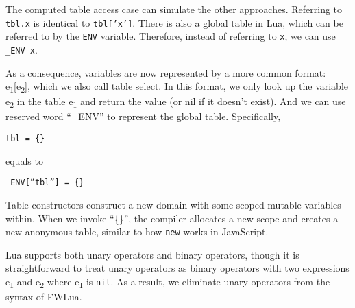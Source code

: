 The computed table access case can simulate the other approaches.
Referring to {\tt tbl.x} is identical to {\tt tbl['x']}.
There is also a global table in Lua, which can be referred to by the {\tt ENV} variable.
Therefore, instead of referring to {\tt x}, we can use {\tt \_ENV x}.

As a consequence, variables are now represented by a more common format: e\textsubscript{1}[e\textsubscript{2}], which we also call table select. In this format, we only look up the variable e\textsubscript{2} in the table e\textsubscript{1} and return the value (or nil if it doesn't exist). And we can use reserved word ``\_ENV'' to represent the global table. Specifically,
\begin{flushleft}
\tt tbl = \{\}\\
\end{flushleft}
equals to
\begin{flushleft}
\tt \_ENV[``tbl''] = \{\}\\
\end{flushleft}

Table constructors
construct a new domain with some scoped mutable variables within.
When we invoke ``\{\}'', the compiler allocates a new scope
and creates a new anonymous table, similar to how {\tt new} works in JavaScript.

Lua supports both
unary operators and binary operators, though it is straightforward to treat unary operators as binary operators
with two expressions e\textsubscript{1} and e\textsubscript{2} where e\textsubscript{1} is {\tt nil}.
As a result, we eliminate unary operators from the syntax of FWLua.


